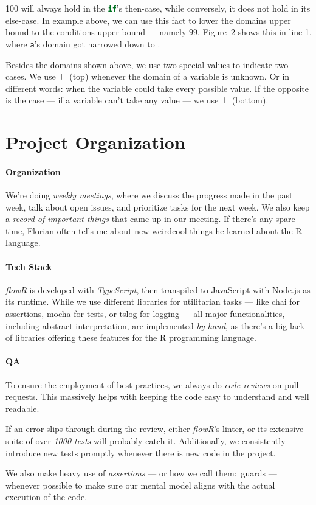 \documentclass[color,coloraccent=red!60!black,listings]{poster}
\def\flowr{\textit{flowR}}
\def\rc#1{\lstinline[language=r]{#1}}
\def\tbot{{\mathversion{kp}$\bot$}}
\def\ttop{{\mathversion{kp}$\top$}}
\begin{document}
\begin{multicols}{3}
\begin{minipage}{\dimexpr2\columnwidth+\columnsep\relax}
{		100} will always hold in the \rc{if}'s then-case, while conversely, it does not
		hold in its else-case. In example above, we can use this fact to lower the
		domains upper bound to the conditions upper bound --- namely $99$. Figure~2
		shows this in line 1, where \rc{a}'s domain  got narrowed down
		to .\par
		Besides the domains shown above, we use two special values to indicate two
		cases. We use \ttop~(top) whenever the domain of a variable is unknown. Or in
		different words: when the variable could take every possible value. If the
		opposite is the case --- if a variable can't take any value --- we use
		\tbot~(bottom).
		\endgroup
	\end{minipage}\vfill\columnbreak\null\columnbreak
	\section*{Project Organization}
	\paragraph{Organization} We're doing \emph{weekly meetings}, where we discuss the
	progress made in the past week, talk about open issues, and prioritize tasks for the
	next week. We also keep a \emph{record of important things} that came up in our
	meeting. If there's any spare time, Florian often tells me about new
	\sout{weird}cool things he learned about the R language.
	\paragraph{Tech Stack} \flowr{} is developed with \emph{TypeScript}, then transpiled
	to JavaScript with Node.js as its runtime. While we use different libraries for
	utilitarian tasks --- like chai for assertions, mocha for tests, or tslog for
	logging --- all major functionalities, including abstract interpretation, are
	implemented \emph{by hand}, as there's a big lack of libraries offering these
	features for the R programming language.
	\paragraph{QA} To ensure the employment of best practices, we always do \emph{code
	reviews} on pull requests. This massively helps with keeping the code easy to
	understand and well readable.\par
	If an error slips through during the review, either \flowr's linter, or its
	extensive suite of over \emph{1000 tests} will probably catch it. Additionally, we
	consistently introduce new tests promptly whenever there is new code in the
	project.\par
	We also make heavy use of \emph{assertions} --- or how we call them:~guards ---
	whenever possible to make sure our mental model aligns with the actual execution of
	the code.

\end{multicols}
\end{document}
